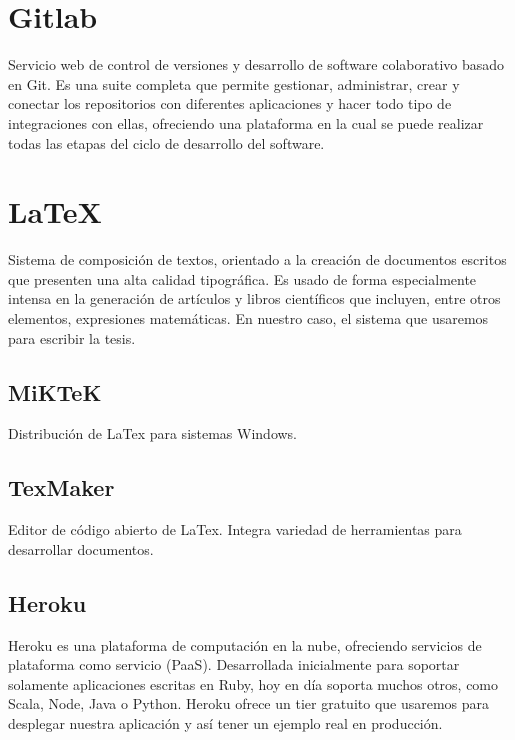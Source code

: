 \section{Gitlab}
Servicio web de control de versiones y desarrollo de software colaborativo basado en Git. Es una suite completa que permite gestionar, administrar, crear y conectar los repositorios con diferentes aplicaciones y hacer todo tipo de integraciones con ellas, ofreciendo una plataforma en la cual se puede realizar todas las etapas del ciclo de desarrollo del software.

\section{LaTeX}
Sistema de composición de textos, orientado a la creación de documentos escritos que presenten una alta calidad tipográfica. Es usado de forma especialmente intensa en la generación de artículos y libros científicos que incluyen, entre otros elementos, expresiones matemáticas. En nuestro caso, el sistema que usaremos para escribir la tesis.

\subsection{MiKTeK}
Distribución de LaTex para sistemas Windows.

\subsection{TexMaker}
Editor de código abierto de LaTex. Integra variedad de herramientas para desarrollar documentos.

\subsection{Heroku}
Heroku es una plataforma de computación en la nube, ofreciendo servicios de plataforma como servicio (PaaS). Desarrollada inicialmente para soportar solamente aplicaciones escritas en Ruby, hoy en día soporta muchos otros, como Scala, Node, Java o Python. Heroku ofrece un tier gratuito que usaremos para desplegar nuestra aplicación y así tener un ejemplo real en producción.